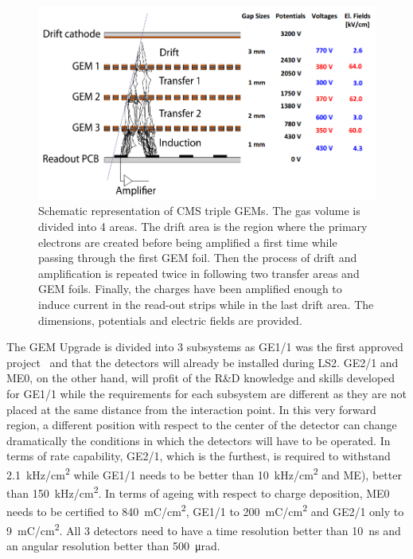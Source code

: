	\begin{figure}[H]
		\centering
		\includegraphics[width=\plotwidth]{fig/chapt3/GEM-drift.png}
		\caption{\label{fig:GEM-drift} Schematic representation of CMS triple GEMs. The gas volume is divided into 4 areas. The drift area is the region where the primary electrons are created before being amplified a first time while passing through the first GEM foil. Then the process of drift and amplification is repeated twice in following two transfer areas and GEM foils. Finally, the charges have been amplified enough to induce current in the read-out strips while in the last drift area. The dimensions, potentials and electric fields are provided.}
	\end{figure}
	
	The GEM Upgrade is divided into 3 subsystems as GE1/1 was the first approved project~\cite{GEM11TDR} and that the detectors will already be installed during LS2. GE2/1 and ME0, on the other hand, will profit of the R\&D knowledge and skills developed for GE1/1 while the requirements for each subsystem are different as they are not placed at the same distance from the interaction point. In this very forward region, a different position with respect to the center of the detector can change dramatically the conditions in which the detectors will have to be operated. In terms of rate capability, GE2/1, which is the furthest, is required to withstand \SI{2.1}{kHz/cm^2} while GE1/1 needs to be better than \SI{10}{kHz/cm^2} and ME), better than \SI{150}{kHz/cm^2}. In terms of ageing with respect to charge deposition, ME0 needs to be certified to \SI{840}{mC/cm^2}, GE1/1 to \SI{200}{mC/cm^2} and GE2/1 only to \SI{9}{mC/cm^2}. All 3 detectors need to have a time resolution better than \SI{10}{ns} and an angular resolution better than \SI{500}{\micro rad}.
	
